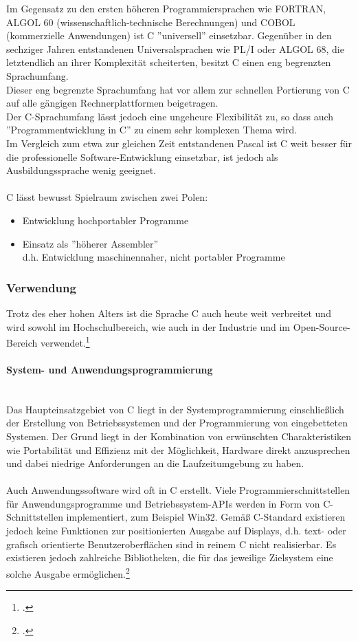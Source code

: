 Im Gegensatz zu den ersten höheren Programmiersprachen wie FORTRAN, ALGOL 60 (wissenschaftlich-technische Berechnungen) und COBOL (kommerzielle Anwendungen) ist C ''universell'' einsetzbar. Gegenüber in den sechziger Jahren entstandenen Universalsprachen wie PL/I oder ALGOL 68, die letztendlich an ihrer Komplexität scheiterten, besitzt C einen eng begrenzten Sprachumfang.\\
Dieser eng begrenzte Sprachumfang hat vor allem zur schnellen Portierung von C auf alle gängigen Rechnerplattformen beigetragen.\\
Der C-Sprachumfang lässt jedoch eine ungeheure Flexibilität zu, so dass auch ''Programmentwicklung in C'' zu einem sehr komplexen Thema wird.\\
Im Vergleich zum etwa zur gleichen Zeit entstandenen Pascal ist C weit besser für die professionelle Software-Entwicklung einsetzbar, ist jedoch als Ausbildungssprache wenig geeignet.\\
\\
C lässt bewusst Spielraum zwischen zwei Polen:
\begin{itemize}
\item Entwicklung hochportabler Programme
\item Einsatz als ''höherer Assembler''\\
d.h. Entwicklung maschinennaher, nicht portabler Programme 
\end{itemize}\cite{c_lang_intro}

\subsubsection{Verwendung}
Trotz des eher hohen Alters ist die Sprache C auch heute weit verbreitet und wird sowohl im Hochschulbereich, wie auch in der Industrie und im Open-Source-Bereich verwendet.\footcite{c_wiki}
\paragraph{System- und Anwendungsprogrammierung}
\ \\
Das Haupteinsatzgebiet von C liegt in der Systemprogrammierung einschließlich der Erstellung von Betriebssystemen und der Programmierung von eingebetteten Systemen. Der Grund liegt in der Kombination von erwünschten Charakteristiken wie Portabilität und Effizienz mit der Möglichkeit, Hardware direkt anzusprechen und dabei niedrige Anforderungen an die Laufzeitumgebung zu haben.\\
\\
Auch Anwendungssoftware wird oft in C erstellt. Viele Programmierschnittstellen für Anwendungsprogramme und Betriebssystem-APIs werden in Form von C-Schnittstellen implementiert, zum Beispiel Win32. Gemäß C-Standard existieren jedoch keine Funktionen zur positionierten Ausgabe auf Displays, d.h. text- oder grafisch orientierte Benutzeroberflächen sind in reinem C nicht realisierbar. Es existieren jedoch zahlreiche Bibliotheken, die für das jeweilige Zielsystem eine solche Ausgabe ermöglichen.\footcite{c_wiki}\\

